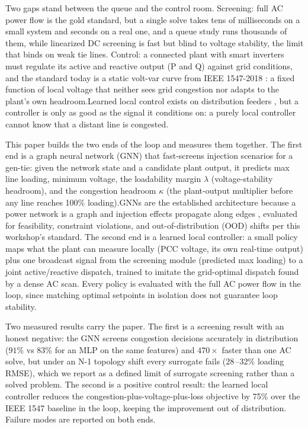 \documentclass{article}
\newcommand{\citep}[1]{\cite{#1}}
\begin{document}
Two gaps stand between the queue and the control room. Screening: full AC
power flow is the gold standard, but a single solve takes tens of
milliseconds on a small system and seconds on a real one, and a queue study
runs thousands of them, while linearized DC screening is fast but blind to
voltage stability, the limit that binds on weak tie lines. Control: a
connected plant with smart inverters must regulate its active and reactive
output (P and Q) against grid conditions, and the standard today is a static
volt-var curve from IEEE 1547-2018 \citep{ieee1547}: a fixed function of
local voltage that neither sees grid congestion nor adapts to the plant's own
headroom.Learned local control exists on
distribution feeders \citep{cui2022lyapunov,guo2023rl,liu2025robust}, but a
controller is only as good as the signal it conditions on: a purely local
controller cannot know that a distant line is congested.

This paper builds the two ends of the loop and measures them together. The
first end is a graph neural network (GNN) that fast-screens injection
scenarios for a gen-tie: given the network state and a candidate plant
output, it predicts max line loading, minimum voltage, the loadability
margin $\lambda$ (voltage-stability headroom), and the congestion headroom
$\kappa$ (the plant-output multiplier before any line reaches 100\%
loading).GNNs are the established architecture because a power
network is a graph and injection effects propagate along edges \citep{donon2020graph,
falk2019warm,zhang2025risk}, evaluated for feasibility, constraint
violations, and out-of-distribution (OOD) shifts per this workshop's
standard. The second end is a learned local controller: a small policy maps
what the plant can measure locally (PCC voltage, its own real-time output)
plus one broadcast signal from the screening module (predicted max loading)
to a joint active/reactive dispatch, trained to imitate the grid-optimal
dispatch found by a dense AC scan. Every policy is evaluated with the full
AC power flow in the loop, since matching optimal setpoints in isolation
does not guarantee loop stability.

Two measured results carry the paper. The first is a screening result with
an honest negative: the GNN screens congestion decisions accurately in
distribution ($91$\% vs $83$\% for an MLP on the same features) and $470\times$
faster than one AC solve, but under an N-1 topology shift every surrogate
fails ($28$\,--$32$\% loading RMSE), which we report as a defined limit of
surrogate screening rather than a solved problem. The second is a positive
control result: the learned local controller reduces the
congestion-plus-voltage-plus-loss objective by 75\% over the IEEE
1547 baseline in the loop, keeping the improvement out of distribution.
Failure modes are reported on both ends.
\end{document}
